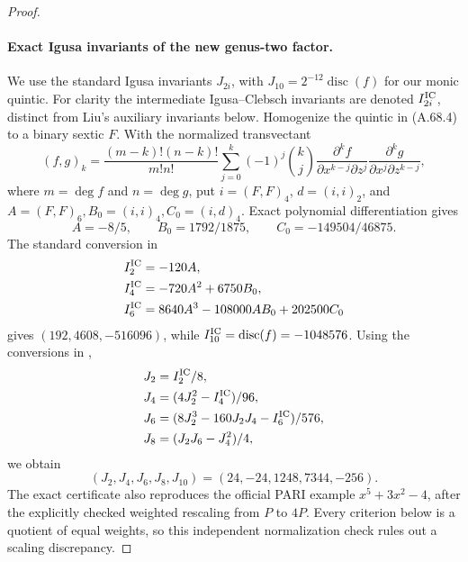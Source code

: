 \begin{proof}
\paragraph{Exact Igusa invariants of the new genus-two factor.}
We use the standard Igusa invariants \(J_{2i}\), with
\(J_{10}=2^{-12}\operatorname{disc}(f)\) for our monic quintic.
For clarity the intermediate Igusa--Clebsch invariants are denoted
\(I^{\rm IC}_{2i}\), distinct from Liu's auxiliary invariants below.
Homogenize the quintic in (A.68.4) to a binary sextic \(F\).
With the normalized transvectant
\[
 (f,g)_k=\frac{(m-k)!(n-k)!}{m!n!}
 \sum_{j=0}^k(-1)^j\binom{k}{j}
 \frac{\partial^kf}{\partial x^{k-j}\partial z^j}
 \frac{\partial^kg}{\partial x^j\partial z^{k-j}},
                                                               \tag{A.68.7}
\]
where \(m=\deg f\) and \(n=\deg g\), put \(i=(F,F)_4\), \(d=(i,i)_2\), and
\(A=(F,F)_6,B_0=(i,i)_4,C_0=(i,d)_4\). Exact polynomial
differentiation gives
\[
 A=-8/5,\qquad B_0=1792/1875,\qquad C_0=-149504/46875.
\]
The standard conversion in \cite{fghSageIgusa}
\[
 \begin{split}
 I^{\rm IC}_2&=-120A,\\
 I^{\rm IC}_4&=-720A^2+6750B_0,\\
 I^{\rm IC}_6&=8640A^3-108000AB_0+202500C_0
 \end{split}
\]
gives \((192,4608,-516096)\), while
\(I^{\rm IC}_{10}=\operatorname{disc}(f)=-1048576\).
Using the conversions in \cite[equation (3), p.3]{fghDabrowskiSadek},
\[
 \begin{aligned}
 J_2&=I^{\rm IC}_2/8,\\
 J_4&=(4J_2^2-I^{\rm IC}_4)/96,\\
 J_6&=(8J_2^3-160J_2J_4-I^{\rm IC}_6)/576,\\
 J_8&=(J_2J_6-J_4^2)/4,
 \end{aligned}
\]
we obtain
\[
                 (J_2,J_4,J_6,J_8,J_{10})
                    =(24,-24,1248,7344,-256).                 \tag{A.68.8}
\]
The exact certificate also reproduces the official PARI example
\cite{fghPARIHyperelliptic}
\(x^5+3x^2-4\), after the explicitly checked weighted rescaling from \(P\) to \(4P\).
Every criterion below is a quotient of equal weights, so this
independent normalization check rules out a scaling discrepancy.


\end{proof}
